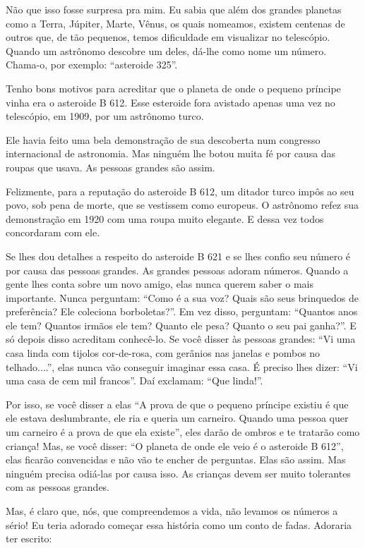 \begin{Parallel}[p]{}{}
{Não que isso fosse surpresa pra mim. Eu sabia que além dos grandes
planetas como a Terra, Júpiter, Marte, Vênus, os quais nomeamos, existem
centenas de outros que, de tão pequenos, temos dificuldade em visualizar
no telescópio. Quando um astrônomo descobre um deles, dá-lhe como nome
um número. Chama-o, por exemplo: ``asteroide 325''.

Tenho bons motivos para acreditar que o planeta de onde o pequeno
príncipe vinha era o asteroide B 612. Esse esteroide fora avistado
apenas uma vez no telescópio, em 1909, por um astrônomo turco.

Ele havia feito uma bela demonstração de sua descoberta num congresso
internacional de astronomia. Mas ninguém lhe botou muita fé por causa
das roupas que usava. As pessoas grandes são assim.

Felizmente, para a reputação do asteroide B 612, um ditador turco impôs
ao seu povo, sob pena de morte, que se vestissem como europeus. O
astrônomo refez sua demonstração em 1920 com uma roupa muito elegante. E
dessa vez todos concordaram com ele.

Se lhes dou detalhes a respeito do asteroide B 621 e se lhes confio seu
número é por causa das pessoas grandes. As grandes pessoas adoram
números. Quando a gente lhes conta sobre um novo amigo, elas nunca
querem saber o mais importante. Nunca perguntam: ``Como é a sua voz?
Quais são seus brinquedos de preferência? Ele coleciona borboletas?''.
Em vez disso, perguntam: ``Quantos anos ele tem? Quantos irmãos ele tem?
Quanto ele pesa? Quanto o seu pai ganha?''. E só depois disso acreditam
conhecê-lo. Se você disser às pessoas grandes: ``Vi uma casa linda com
tijolos cor-de-rosa, com gerânios nas janelas e pombos no telhado....'',
elas nunca vão conseguir imaginar essa casa. É preciso lhes dizer: ``Vi
uma casa de cem mil francos''. Daí exclamam: ``Que linda!''.

Por isso, se você disser a elas ``A prova de que o pequeno príncipe
existiu é que ele estava deslumbrante, ele ria e queria um carneiro.
Quando uma pessoa quer um carneiro é a prova de que ela existe'', eles
darão de ombros e te tratarão como criança! Mas, se você disser: ``O
planeta de onde ele veio é o asteroide B 612'', elas ficarão convencidas
e não vão te encher de perguntas. Elas são assim. Mas ninguém precisa
odiá-las por causa isso. As crianças devem ser muito tolerantes com as
pessoas grandes.

Mas, é claro que, nós, que compreendemos a vida, não levamos os números
a sério! Eu teria adorado começar essa história como um conto de fadas.
Adoraria ter escrito:

}
\end{Parallel}
